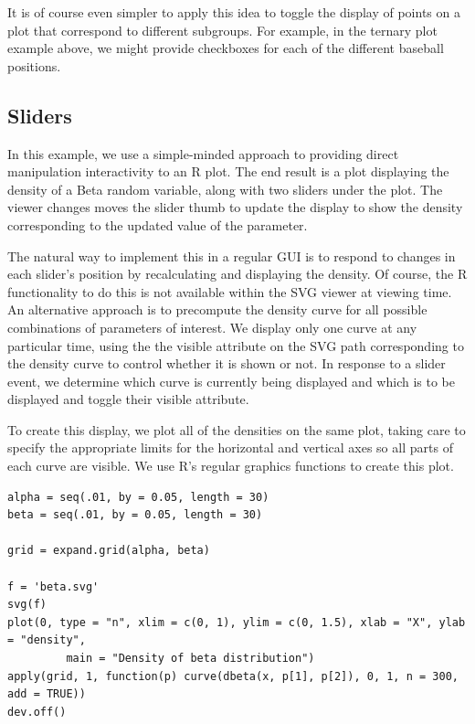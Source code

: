 \documentclass[article]{jss}
\begin{document}
It is of course even simpler to apply this idea to toggle the display
of points on a plot that correspond to different subgroups.  For
example, in the ternary plot example above, we might provide
checkboxes for each of the different baseball positions.

\subsection{Sliders}
In this example, we use a simple-minded approach to providing direct
manipulation interactivity to an R plot.  The end result is a plot
displaying the density of a Beta random variable, along with two
sliders under the plot.  The viewer changes moves the slider thumb to
update the display to show the density corresponding to the updated
value of the parameter.

The natural way to implement this in a regular GUI is to respond to
changes in each slider's position by recalculating and displaying the
density.  Of course, the R functionality to do this is not available
within the SVG viewer at viewing time.  An alternative approach is to
precompute the density curve for all possible combinations of parameters of interest.
We display only one curve at any particular time, using the the
visible attribute on the SVG path corresponding to the density curve
to control whether it is shown or not.  In response to a slider
event, we determine which curve is currently being displayed and which
is to be displayed and toggle their visible attribute.

To create this display,  we plot all of the densities on the same plot, taking
care to specify the appropriate limits for the horizontal and vertical
axes so all parts of each curve are visible.  We use R's regular
graphics functions to create this plot.

\begin{verbatim}
alpha = seq(.01, by = 0.05, length = 30)
beta = seq(.01, by = 0.05, length = 30)

grid = expand.grid(alpha, beta)

f = 'beta.svg'
svg(f)
plot(0, type = "n", xlim = c(0, 1), ylim = c(0, 1.5), xlab = "X", ylab = "density",
         main = "Density of beta distribution")
apply(grid, 1, function(p) curve(dbeta(x, p[1], p[2]), 0, 1, n = 300, add = TRUE))
dev.off()
\end{verbatim}
\end{document}
